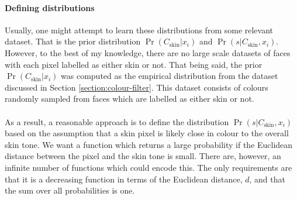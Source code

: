 \paragraph{Defining distributions}
Usually, one might attempt to learn these distributions from some relevant dataset. That is the prior distribution $\Pr(C_\mathrm{skin}|x_i)$ and $\Pr(s|C_\mathrm{skin}, x_i)$.
However, to the best of my knowledge, there are no large scale datasets of faces with each pixel labelled as either skin or not. That being said, the prior $\Pr(C_\mathrm{skin}|x_i)$ was computed as the empirical distribution from 
the dataset discussed in Section \ref{section:colour-filter}. This dataset consists of colours randomly sampled from faces which are labelled as either skin or not.
\\\\
As a result, a reasonable approach is to define the distribution $\Pr(s|C_\mathrm{skin}, x_i)$ based on the assumption that a skin pixel is likely close in colour to the overall skin tone. We want a function which returns a large probability if the Euclidean distance between the pixel and the skin tone is small.
There are, however, an infinite number of functions which could encode this. The only requirements are that it is a decreasing function in terms of the Euclidean distance, $d$, and that the sum over all probabilities is one.


 


















